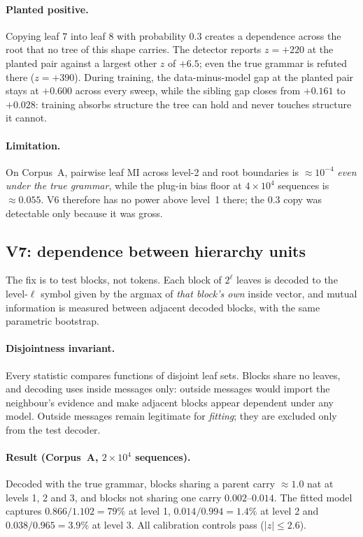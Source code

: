 \documentclass[11pt,a4paper]{article}
\theoremstyle{plain}
\theoremstyle{definition}
\begin{document}
\paragraph{Planted positive.}
Copying leaf $7$ into leaf $8$ with probability $0.3$ creates a dependence
across the root that no tree of this shape carries. The detector reports
$z=+220$ at the planted pair against a largest other $z$ of $+6.5$; even the
true grammar is refuted there ($z=+390$). During training, the data-minus-model
gap at the planted pair stays at $+0.600$ across every sweep, while the
sibling gap closes from $+0.161$ to $+0.028$: training absorbs structure the
tree can hold and never touches structure it cannot.

\paragraph{Limitation.}
On Corpus~A, pairwise leaf MI across level-2 and root boundaries is $\approx
10^{-4}$ \emph{even under the true grammar}, while the plug-in bias floor at
$4\times10^4$ sequences is $\approx 0.055$. V6 therefore has no power above
level~1 there; the $0.3$ copy was detectable only because it was gross.

\subsection{V7: dependence between hierarchy units}

The fix is to test blocks, not tokens. Each block of $2^\ell$ leaves is decoded
to the level-$\ell$ symbol given by the argmax of \emph{that block's own}
inside vector, and mutual information is measured between adjacent decoded
blocks, with the same parametric bootstrap.

\paragraph{Disjointness invariant.}
Every statistic compares functions of disjoint leaf sets. Blocks share no
leaves, and decoding uses inside messages only: outside messages would import
the neighbour's evidence and make adjacent blocks appear dependent under any
model. Outside messages remain legitimate for \emph{fitting}; they are excluded
only from the test decoder.

\paragraph{Result (Corpus~A, $2\times10^4$ sequences).}
Decoded with the true grammar, blocks sharing a parent carry $\approx 1.0$ nat
at levels 1, 2 and 3, and blocks not sharing one carry $0.002$--$0.014$. The
fitted model captures $0.866/1.102 = 79\%$ at level 1, $0.014/0.994 = 1.4\%$ at
level 2 and $0.038/0.965 = 3.9\%$ at level 3. All calibration controls pass
($|z| \le 2.6$).
\end{document}
